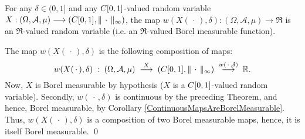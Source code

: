 \begin{corollary}
\mbox{}\vskip 0.1cm
\noindent
For any $\delta \in (0,1]$ and any $C[0,1]$-valued random variable
$X : (\Omega,\mathcal{A},\mu) \longrightarrow (C[0,1],\Vert\,\cdot\,\Vert_{\infty})$,
the map
$w(X(\,\cdot\,),\delta) : (\Omega,\mathcal{A},\mu) \longrightarrow \Re$
is an $\Re$-valued random variable (i.e. an $\Re$-valued Borel measurable function).
\end{corollary}
\proof
The map $w(X(\,\cdot\,),\delta)$ is the following composition of maps:
\begin{equation*}
w(X(\,\cdot\,),\delta)
\;:\; (\Omega,\mathcal{A},\mu) \;\overset{X}{\longrightarrow}\; (C[0,1],\Vert\,\cdot\,\Vert_{\infty})
\;\overset{w(\,\cdot\,,\delta)}{\longrightarrow}\; \mathbb{R}.
\end{equation*}
Now, $X$ is Borel measurable by hypothesis ($X$ is a $C[0,1]$-valued random variable).
Secondly, $w(\,\cdot\,,\delta)$ is continuous by the preceding Theorem, and hence,
Borel measurable, by Corollary \ref{ContinuousMapsAreBorelMeasurable}.
Thus, $w(X(\,\cdot\,),\delta)$ is a composition of two Borel measurable maps, hence,
it is itself Borel measurable.
\qed

